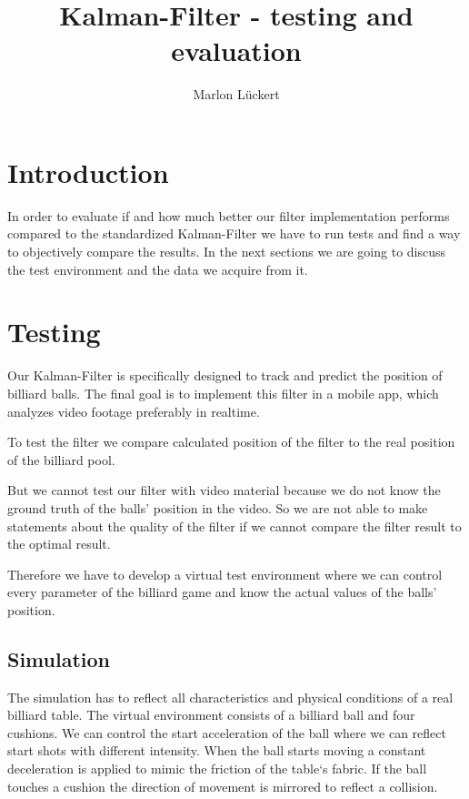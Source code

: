 \documentclass[12pt, letterpaper, twoside]{article}
\title{Kalman-Filter - testing and evaluation}
\author{Marlon Lückert}
\begin{document}
\begin{titlepage}
\maketitle
\end{titlepage}

\section{Introduction}

In order to evaluate if and how much better our filter implementation performs
compared to the standardized Kalman-Filter
we have to run tests and find a way to objectively compare the results.
In the next sections we are going to discuss the test environment and the data we acquire from it.

\section{Testing}

Our Kalman-Filter is specifically designed to track and predict the position of billiard balls.
The final goal is to implement this filter in a mobile app, which analyzes video footage preferably in realtime.

To test the filter we compare calculated position of the filter to the real position of the billiard pool.

But we cannot test our filter with video material because we do not know the ground truth of the balls' position in the video.
So we are not able to make statements about the quality of the filter if we cannot compare the filter result to the optimal result.

Therefore we have to develop a virtual test environment where we can control every parameter of the billiard game and know the actual values of the balls' position.

\subsection{Simulation}

The simulation has to reflect all characteristics and physical conditions of a real billiard table.
The virtual environment consists of a billiard ball and four cushions.
We can control the start acceleration of the ball where we can reflect start shots with different intensity.
When the ball starts moving a constant deceleration is applied to mimic the friction of the table`s fabric.
If the ball touches a cushion the direction of movement is mirrored to reflect a collision.
\end{document}
